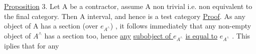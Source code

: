 \uline{Proposition} 3. Let A be a contractor, assume A non trivial i.e.
non equivalent to the final category. Then A 
interval, and hence  is a  test category
\uline{Proof}. As any object of A has a section (over $e_{A^{\wedge}}$) , it follows
immediately that any non-empty object of $A^{\wedge}$ has a section too, hence
\uline{any}  \uline{subobject of $e_{A^{\wedge}}$} \uline{is equal to} $e_{A^{\wedge}}$ . This iplies that for any


